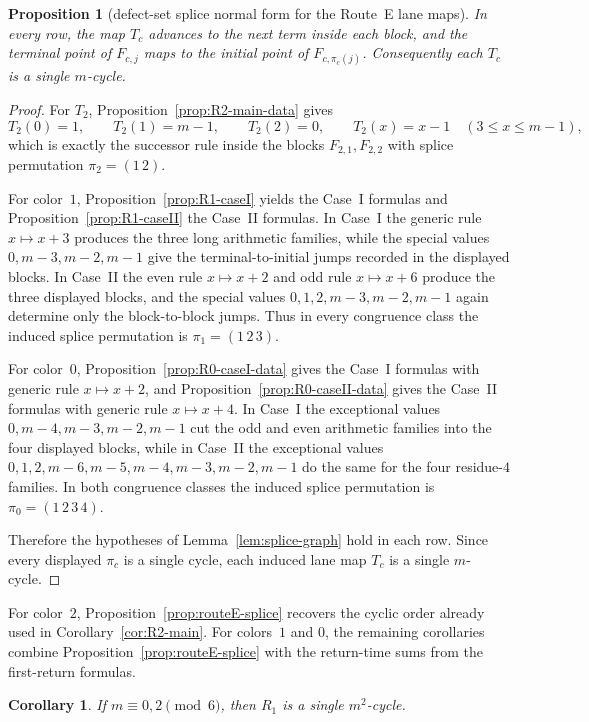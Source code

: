 \documentclass[11pt]{article}
\newtheorem{corollary}{Corollary}
\newtheorem{proposition}{Proposition}
\begin{document}
\begin{proposition}[defect-set splice normal form for the Route~E lane maps]
In every row, the map $T_c$ advances to the next term inside each block, and the terminal point of $F_{c,j}$ maps to the initial point of $F_{c,\pi_c(j)}$.
Consequently each $T_c$ is a single $m$-cycle.
\end{proposition}

\begin{proof}
For $T_2$, Proposition~\ref{prop:R2-main-data} gives
\[
T_2(0)=1,\qquad T_2(1)=m-1,\qquad T_2(2)=0,\qquad T_2(x)=x-1\quad (3\le x\le m-1),
\]
which is exactly the successor rule inside the blocks $F_{2,1},F_{2,2}$ with splice permutation $\pi_2=(1\,2)$.

For color~$1$, Proposition~\ref{prop:R1-caseI} yields the Case~I formulas and Proposition~\ref{prop:R1-caseII} the Case~II formulas.
In Case~I the generic rule $x\mapsto x+3$ produces the three long arithmetic families, while the special values $0,m-3,m-2,m-1$ give the terminal-to-initial jumps recorded in the displayed blocks.
In Case~II the even rule $x\mapsto x+2$ and odd rule $x\mapsto x+6$ produce the three displayed blocks, and the special values $0,1,2,m-3,m-2,m-1$ again determine only the block-to-block jumps.
Thus in every congruence class the induced splice permutation is $\pi_1=(1\,2\,3)$.

For color~$0$, Proposition~\ref{prop:R0-caseI-data} gives the Case~I formulas with generic rule $x\mapsto x+2$, and Proposition~\ref{prop:R0-caseII-data} gives the Case~II formulas with generic rule $x\mapsto x+4$.
In Case~I the exceptional values $0,m-4,m-3,m-2,m-1$ cut the odd and even arithmetic families into the four displayed blocks, while in Case~II the exceptional values $0,1,2,m-6,m-5,m-4,m-3,m-2,m-1$ do the same for the four residue-$4$ families.
In both congruence classes the induced splice permutation is $\pi_0=(1\,2\,3\,4)$.

Therefore the hypotheses of Lemma~\ref{lem:splice-graph} hold in each row.
Since every displayed $\pi_c$ is a single cycle, each induced lane map $T_c$ is a single $m$-cycle.
\end{proof}

For color~$2$, Proposition~\ref{prop:routeE-splice} recovers the cyclic order already used in Corollary~\ref{cor:R2-main}.
For colors~$1$ and $0$, the remaining corollaries combine Proposition~\ref{prop:routeE-splice} with the return-time sums from the first-return formulas.

\begin{corollary}\label{cor:R1-caseI}
If $m\equiv 0,2\pmod 6$, then $R_1$ is a single $m^2$-cycle.
\end{corollary}
\end{document}
